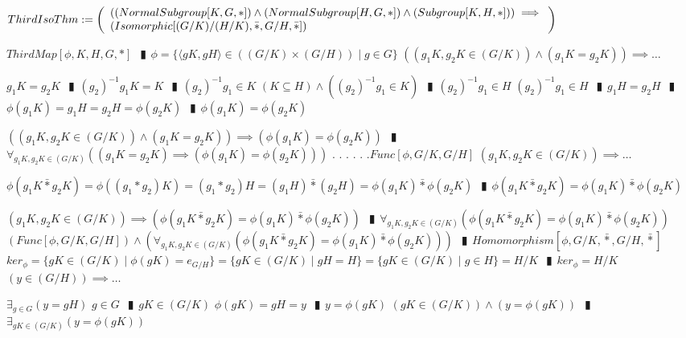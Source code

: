 \documentclass{book}
\newcommand{\abr}{:=}
\newcommand{\cont}{\phantom{.}. . .\phantom{.}}
\newcommand{\pipe}{$\phantom{(}\vrectangleblack\phantom{)}$}
\newcommand{\pr}[1]{\left(#1\right)}
\newcommand{\bbin}[1]{\mathbin{{\bar{#1}}}}
\newcommand{\st}{\mathbin{|}}
\begin{document}
$ThirdIsoThm \abr \left(\begin{array}{ll}
  \pr{(NormalSubgroup[K, G, *]) \hfill \land \hfill (NormalSubgroup[H, G, *]) \hfill \land \hfill (Subgroup[K, H, *])} \hfill \implies \hfill \\
  \pr{Isomorphic[(G / K) / (H / K), \bbin{*}, G / H, \bbin{*}]}
\end{array}\right)$
\begin{enumerate}
  \lit $ThirdMap[\phi, K, H, G, *]$ \pipe $\phi = \{\langle g K, g H \rangle \in \pr{(G / K) \times (G / H)} \st g \in G\}$
  \lit $\pr{\pr{g_1 K, g_2 K \in (G / K)} \land (g_1 K = g_2 K)} \implies \ldots$
  \begin{enumerate}
    \lit $g_1 K = g_2 K$ \pipe $(g_2)^{-1} g_1 K = K$ \pipe $(g_2)^{-1} g_1 \in K$
    \lit $(K \subseteq H) \land \pr{(g_2)^{-1} g_1 \in K}$ \pipe $(g_2)^{-1} g_1 \in H$
    \lit $(g_2)^{-1} g_1 \in H$ \pipe $g_1 H = g_2 H$ \pipe $\phi(g_1 K) = g_1 H = g_2 H = \phi(g_2 K)$ \pipe $\phi(g_1 K) = \phi(g_2 K)$
  \end{enumerate}
  \lit $\pr{\pr{g_1 K, g_2 K \in (G / K)} \land (g_1 K = g_2 K)} \implies \pr{\phi(g_1 K) = \phi(g_2 K)}$ \pipe $\forall_{g_1 K, g_2 K \in (G / K)}\pr{(g_1 K = g_2 K) \implies \pr{\phi(g_1 K) = \phi(g_2 K)}}$ \cont
  \lit \cont $Func[\phi, G / K, G / H]$
  \lit $\pr{g_1 K, g_2 K \in (G / K)} \implies \ldots$
  \begin{enumerate}
    \lit $\phi(g_1 K \bbin{*} g_2 K) = \phi\pr{(g_1 * g_2) K} = (g_1 * g_2) H = (g_1 H) \bbin{*} (g_2 H) = \phi(g_1 K) \bbin{*} \phi(g_2 K)$ \pipe $\phi(g_1 K \bbin{*} g_2 K) = \phi(g_1 K) \bbin{*} \phi(g_2 K)$
  \end{enumerate}
  \lit $\pr{g_1 K, g_2 K \in (G / K)} \implies \pr{\phi(g_1 K \bbin{*} g_2 K) = \phi(g_1 K) \bbin{*} \phi(g_2 K)}$ \pipe $\forall_{g_1 K, g_2 K \in (G / K)}\pr{\phi(g_1 K \bbin{*} g_2 K) = \phi(g_1 K) \bbin{*} \phi(g_2 K)}$
  \lit $(Func[\phi, G / K, G / H]) \land \pr{\forall_{g_1 K, g_2 K \in (G / K)}\pr{\phi(g_1 K \bbin{*} g_2 K) = \phi(g_1 K) \bbin{*} \phi(g_2 K)}}$ \pipe $Homomorphism[\phi, G / K, \bbin{*}, G / H, \bbin{*}]$
  \lit $ker_\phi = \{g K \in (G / K) \st \phi(g K) = e_{G / H}\} = \{g K \in (G / K) \st g H = H\} = \{g K \in (G / K) \st g \in H\} = H / K$ \pipe $ker_\phi = H / K$
  \lit $\pr{y \in (G / H)} \implies \ldots$
  \begin{enumerate}
    \lit $\exists_{g \in G}(y = g H)$
    \lit $g \in G$ \pipe $g K \in (G / K)$
    \lit $\phi(g K) = g H = y$ \pipe $y = \phi(g K)$
    \lit $\pr{g K \in (G / K)} \land \pr{y = \phi(g K)}$ \pipe $\exists_{g K \in (G / K)}\pr{y = \phi(g K)}$

\end{enumerate}
\end{enumerate}
\end{document}
